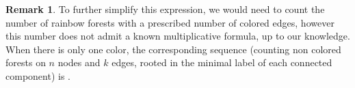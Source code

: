 \documentclass{amsart}
\theoremstyle{definition}
\newtheorem{remark}[theorem]{Remark}
\renewcommand{\b}[1]{{\boldsymbol{#1}}} %
\newcommand{\eqdef}{\mbox{\,\raisebox{0.2ex}{\scriptsize\ensuremath{\mathrm:}}\ensuremath{=}\,}} %
\newcommand{\resp}{\textit{resp.}~} %
\newcommand{\OEIS}[1]{\cite[{\rm \href{http://oeis.org/#1}{\texttt{#1}}}]{OEIS}}
\renewcommand{\b}[1]{\boldsymbol{#1}} %
\begin{document}
%
%
%

\begin{remark}
To further simplify this expression, we would need to count the number of rainbow forests with a prescribed number of colored edges, however this number does not admit a  known multiplicative formula, up to our knowledge. When there is only one color, the corresponding sequence (counting non colored forests on $n$ nodes and $k$ edges, rooted in the minimal label of each connected component) is \OEIS{A138464}.
\end{remark}
\end{document}
